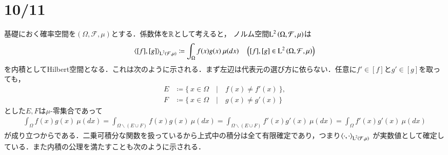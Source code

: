 \section{10/11}
	基礎におく確率空間を$(\Omega,\mathcal{F},\mu)$とする．係数体を$\mathbb{R}$として考えると，
	ノルム空間$\operatorname{L}^{2} \left(\Omega,\mathcal{F},\mu\right)$は
	\begin{align}
		\inprod<[f],[g]>_{\Lp{2}{\mathcal{F},\mu}} \coloneqq \int_{\Omega} f(x)g(x)\ \mu(dx) \quad \left( [f],[g] \in \Lp{2}{\Omega,\mathcal{F},\mu} \right)
	\end{align}
	を内積としてHilbert空間となる．これは次のように示される．まず左辺は代表元の選び方に依らない．任意に$f' \in [f]$と$g' \in [g]$を取っても，
	\begin{align}
		E &\coloneqq \{\ x \in \Omega\quad |\quad f(x) \neq f'(x)\ \}, \\
		F &\coloneqq \{\ x \in \Omega\quad |\quad g(x) \neq g'(x)\ \}
	\end{align}
	とした$E,F$は$\mu$-零集合であって
	\begin{align}
		\int_{\Omega} f(x)g(x)\ \mu(dx) = \int_{\Omega \backslash (E \cup F)} f(x)g(x)\ \mu(dx)
		= \int_{\Omega \backslash (E \cup F)} f'(x)g'(x)\ \mu(dx) = \int_{\Omega} f'(x)g'(x)\ \mu(dx)
	\end{align}
	が成り立つからである．二乗可積分な関数を扱っているから上式中の積分は全て有限確定であり，つまり$\inprod<\cdot,\cdot>_{\Lp{2}{\mathcal{F},\mu}}$
	が実数値として確定している．また内積の公理を満たすことも次のように示される．
